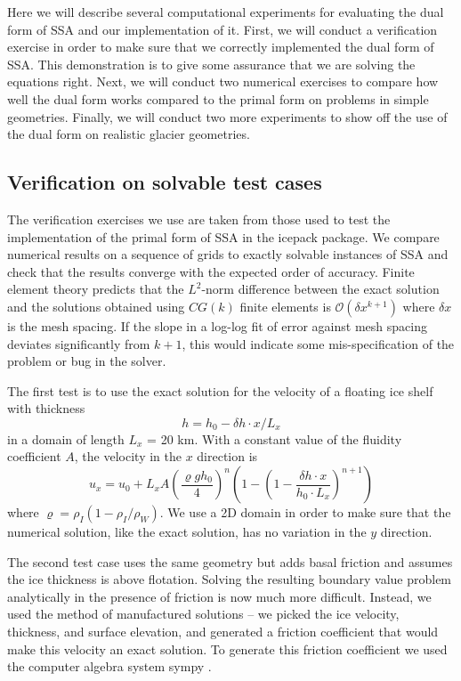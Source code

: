 \documentclass[review,oneside]{igs}
\begin{document}
Here we will describe several computational experiments for evaluating the dual form of SSA and our implementation of it.
First, we will conduct a verification exercise in order to make sure that we correctly implemented the dual form of SSA.
This demonstration is to give some assurance that we are solving the equations right.
Next, we will conduct two numerical exercises to compare how well the dual form works compared to the primal form on problems in simple geometries.
Finally, we will conduct two more experiments to show off the use of the dual form on realistic glacier geometries.


\subsection{Verification on solvable test cases}

The verification exercises we use are taken from those used to test the implementation of the primal form of SSA in the icepack package\citep{shapero2021icepack}.
We compare numerical results on a sequence of grids to exactly solvable instances of SSA and check that the results converge with the expected order of accuracy.
Finite element theory predicts that the $L^2$-norm difference between the exact solution and the solutions obtained using $CG(k)$ finite elements is $\mathscr{O}(\delta x^{k + 1})$ where $\delta x$ is the mesh spacing.
If the slope in a log-log fit of error against mesh spacing deviates significantly from $k + 1$, this would indicate some mis-specification of the problem or bug in the solver.

The first test is to use the exact solution for the velocity of a floating ice shelf with thickness
\begin{equation}
    h = h_0 - \delta h \cdot x / L_x
\end{equation}
in a domain of length $L_x$ = 20 km.
With a constant value of the fluidity coefficient $A$, the velocity in the $x$ direction is
\begin{equation}
    u_x = u_0 + L_x A \left(\frac{\varrho g h_0}{4}\right)^n\left(1 - \left(1 - \frac{\delta h \cdot x}{h_0\cdot L_x}\right)^{n + 1}\right)
\end{equation}
where $\varrho = \rho_I(1 - \rho_I/\rho_W)$.
We use a 2D domain in order to make sure that the numerical solution, like the exact solution, has no variation in the $y$ direction.

The second test case uses the same geometry but adds basal friction and assumes the ice thickness is above flotation.
Solving the resulting boundary value problem analytically in the presence of friction is now much more difficult.
Instead, we used the method of manufactured solutions -- we picked the ice velocity, thickness, and surface elevation, and generated a friction coefficient that would make this velocity an exact solution.
To generate this friction coefficient we used the computer algebra system sympy \citep{sympy}.
\end{document}
